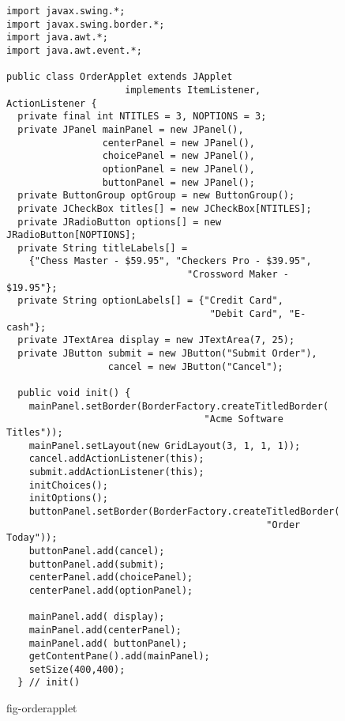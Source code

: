 \begin{figure}[p]
\jjjprogstart
\begin{jjjlisting}[28pc]
\begin{lstlisting}
import javax.swing.*;
import javax.swing.border.*;
import java.awt.*;
import java.awt.event.*;

public class OrderApplet extends JApplet 
                     implements ItemListener, ActionListener {
  private final int NTITLES = 3, NOPTIONS = 3;
  private JPanel mainPanel = new JPanel(),
                 centerPanel = new JPanel(),
                 choicePanel = new JPanel(),
                 optionPanel = new JPanel(),
                 buttonPanel = new JPanel();
  private ButtonGroup optGroup = new ButtonGroup();
  private JCheckBox titles[] = new JCheckBox[NTITLES];
  private JRadioButton options[] = new JRadioButton[NOPTIONS];
  private String titleLabels[] =
    {"Chess Master - $59.95", "Checkers Pro - $39.95",
                                "Crossword Maker - $19.95"};
  private String optionLabels[] = {"Credit Card", 
                                    "Debit Card", "E-cash"};
  private JTextArea display = new JTextArea(7, 25);
  private JButton submit = new JButton("Submit Order"),
                  cancel = new JButton("Cancel");

  public void init() {
    mainPanel.setBorder(BorderFactory.createTitledBorder(
                                   "Acme Software Titles"));
    mainPanel.setLayout(new GridLayout(3, 1, 1, 1));
    cancel.addActionListener(this);
    submit.addActionListener(this);
    initChoices();
    initOptions();
    buttonPanel.setBorder(BorderFactory.createTitledBorder(
                                              "Order Today"));
    buttonPanel.add(cancel);
    buttonPanel.add(submit);
    centerPanel.add(choicePanel);
    centerPanel.add(optionPanel);

    mainPanel.add( display);
    mainPanel.add(centerPanel);
    mainPanel.add( buttonPanel);
    getContentPane().add(mainPanel);
    setSize(400,400);
  } // init()
\end{lstlisting}
\end{jjjlisting}
{fig-orderapplet}
\end{figure}

